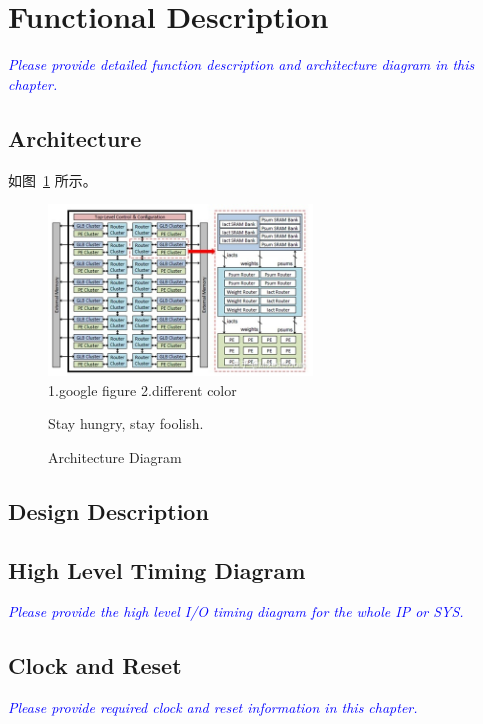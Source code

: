 
\clearpage

\section{Functional Description}
\noindent\textit{\small\textcolor{blue}{Please provide detailed function description and architecture diagram in this chapter.}}

\subsection{Architecture}

如图~\ref{fig.googles} 所示。

\begin{figure}[ht]
    \centering
    \includegraphics[width=7cm]{figure/eyerissv2.jpg} \\
      1.google figure 2.different color 
    \caption{Architecture Diagram} 
    {Stay hungry, stay foolish.}
   \label{fig.googles}
\end{figure}

\subsection{Design Description}

\subsection{High Level Timing Diagram}
\noindent\textit{\small\textcolor{blue}{Please provide the high level I/O timing diagram for the whole IP or SYS.}}

\subsection{Clock and Reset}
\noindent\textit{\small\textcolor{blue}{Please provide required clock and reset information in this chapter.}}

